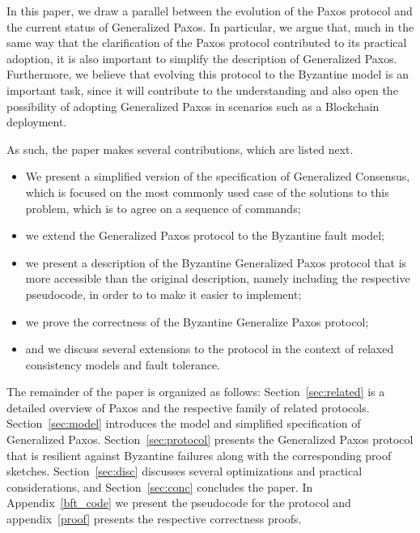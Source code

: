 
In this paper, we draw a parallel between the evolution of the Paxos
protocol and the current status of Generalized Paxos. In particular,
we argue that, much in the same way that the clarification of the Paxos
protocol contributed to its practical adoption, it is also important
to simplify the description of Generalized Paxos. Furthermore, we believe
that evolving this protocol to the Byzantine model is an important
task, since it will contribute to the understanding
and also open the possibility of adopting Generalized Paxos in
scenarios such as a Blockchain deployment.

As such, the paper makes several contributions, which are listed next.
%
\begin{itemize}
\item
We present a simplified version of the specification of Generalized
Consensus, which is focused on the most commonly used case of the
solutions to this problem, which is to agree on a sequence of
commands;

\item
we extend the Generalized Paxos protocol to the Byzantine fault model; 

\item
we present a description of the Byzantine Generalized Paxos protocol
that is more accessible than the original description, namely including the
respective pseudocode, in order to to make it 
easier to implement;

\item
we prove the correctness of the Byzantine Generalize Paxos protocol;

\item
and we discuss several extensions to the protocol in the context of relaxed consistency models and fault tolerance.
\end{itemize}
%
The remainder of the paper is organized as follows: 
Section~\ref{sec:related} is a detailed overview of Paxos and the respective family of related protocols.
Section~\ref{sec:model} introduces the model and simplified specification of Generalized Paxos.
Section~\ref{sec:protocol} presents the Generalized Paxos protocol that is resilient against Byzantine failures along with the corresponding proof sketches. 
Section~\ref{sec:disc} discusses several optimizations and practical considerations, and Section~\ref{sec:conc} concludes the paper. In Appendix~\ref{bft_code} we present the pseudocode for the protocol and appendix~\ref{proof} presents the respective correctness proofs.
%
